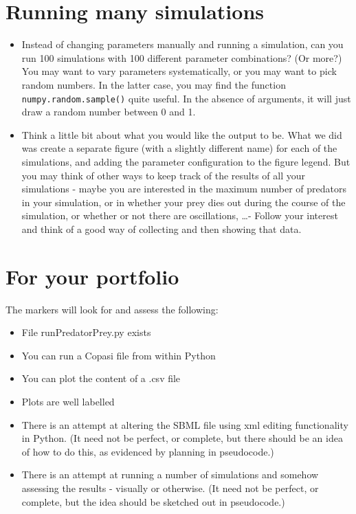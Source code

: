 \documentclass[pdflatex,a4paper]{article}
\begin{document}
\begin{itemize}
\end{itemize}

\section{Running many simulations}

\begin{itemize}
\item
Instead of changing parameters manually and running a simulation, can you run 100 simulations with 100 different parameter combinations? (Or more?) You may want to vary parameters systematically, or you may want to pick random numbers. In the latter case, you may find the function \verb=numpy.random.sample()= quite useful. In the absence of arguments, it will just draw a random number between 0 and 1.
\item
Think a little bit about what you would like the output to be. What we did was create a separate figure (with a slightly different name) for each of the simulations, and adding the parameter configuration to the figure legend. But you may think of other ways to keep track of the results of all your simulations - maybe you are interested in the maximum number of predators in your simulation, or in whether your prey dies out during the course of the simulation, or whether or not there are oscillations, \dots - Follow your interest and think of a good way of collecting and then showing that data. 
\end{itemize}




\section{For your portfolio}

The markers will look for and assess the following:

\begin{itemize}
\item
File runPredatorPrey.py exists
\item
You can run a Copasi file from within Python
\item
You can plot the content of a .csv file
\item
Plots are well labelled
\item
There is an attempt at altering the SBML file using xml editing functionality in Python. (It need not be perfect, or complete, but there should be an idea of how to do this, as evidenced by planning in pseudocode.)
\item
There is an attempt at running a number of simulations and somehow assessing the results - visually or otherwise. (It need not be perfect, or complete, but the idea should be sketched out in pseudocode.)
\end{itemize}
\end{document}
